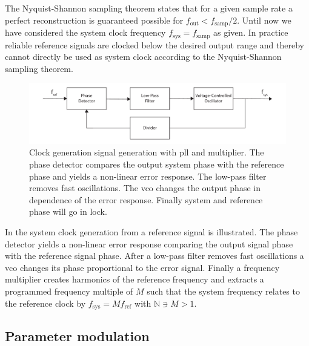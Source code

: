 The Nyquist-Shannon sampling theorem states that for a given sample rate a
perfect reconstruction is guaranteed possible for
$f_\text{out}<f_\text{samp}/2$. Until now we have considered the system clock
frequency $f_\text{sys}=f_\text{samp}$ as given. In practice reliable
reference signals are clocked below the desired output range and thereby
cannot directly be used as system clock according to the Nyquist-Shannon
sampling theorem.
\begin{figure}[htb]
  \centering
  \includegraphics[width=\textwidth]
  {../figure/digital-signal-synthesis/clock-generation.pdf}
  \caption{Clock generation signal generation with \gls{pll} and multiplier.
    The phase detector compares the output system phase with the reference
    phase and yields a non-linear error response. The low-pass filter removes
    fast oscillations. The \gls{vco} changes the output phase in dependence
    of the error response. Finally system and reference phase will go in lock.
    }\label{fig:dds_clock_generation}
\end{figure}
In  the system clock generation from a
reference signal is illustrated. The phase detector yields a non-linear error
response comparing the output signal phase with the reference signal phase.
After a low-pass filter removes fast oscillations a \gls{vco} changes its
phase proportional to the error signal. Finally a frequency multiplier creates
harmonics of the reference frequency and extracts a programmed frequency
multiple of $M$ such that the system frequency relates to the reference
clock by $f_\text{sys}=Mf_\text{ref}$ with $\mathbb{N}\ni M>1$.

\subsection{Parameter modulation}

